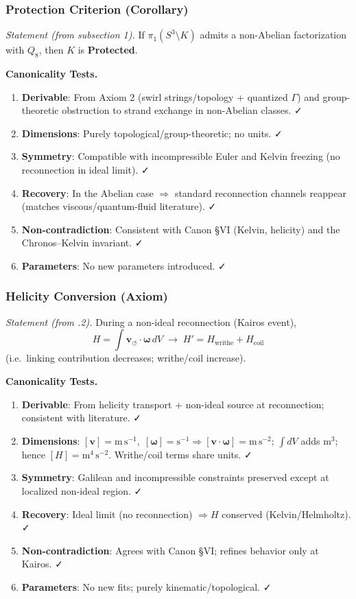 \documentclass[10pt,reprint,aps,onecolumn,nofootinbib]{revtex4-2}
\begin{document}
\subsubsection{Protection Criterion (Corollary)}
\emph{Statement (from subsection 1).} If $\pi_1(S^3\!\setminus\!K)$ admits a non-Abelian factorization with $Q_8$, then $K$ is \textbf{Protected}.

\textbf{Canonicality Tests.}
\begin{enumerate}
    \item \textbf{Derivable}: From Axiom 2 (swirl strings/topology + quantized $\Gamma$) and group-theoretic obstruction to strand exchange in non-Abelian classes. ✓
    \item \textbf{Dimensions}: Purely topological/group-theoretic; no units. ✓
    \item \textbf{Symmetry}: Compatible with incompressible Euler and Kelvin freezing (no reconnection in ideal limit). ✓
    \item \textbf{Recovery}: In the Abelian case $\Rightarrow$ standard reconnection channels reappear (matches viscous/quantum-fluid literature). ✓
    \item \textbf{Non-contradiction}: Consistent with Canon §VI (Kelvin, helicity) and the Chronos–Kelvin invariant. ✓
    \item \textbf{Parameters}: No new parameters introduced. ✓
\end{enumerate}

\subsubsection{Helicity Conversion (Axiom)}
\emph{Statement (from .2).} During a non-ideal reconnection (Kairos event),
\[
    H=\!\int \mathbf{v}_{\!\boldsymbol{\circlearrowleft}}\!\cdot\!\boldsymbol{\omega}\, dV
    \;\to\; H' = H_{\text{writhe}} + H_{\text{coil}}
\]
(i.e.\ linking contribution decreases; writhe/coil increase).

\textbf{Canonicality Tests.}
\begin{enumerate}
    \item \textbf{Derivable}: From helicity transport + non-ideal source at reconnection; consistent with literature. ✓
    \item \textbf{Dimensions}: $[\mathbf{v}]=\mathrm{m\,s^{-1}},\; [\boldsymbol{\omega}]=\mathrm{s^{-1}}\Rightarrow [\mathbf{v}\!\cdot\!\boldsymbol{\omega}]=\mathrm{m\,s^{-2}}$; $\int dV$ adds $\mathrm{m^3}$; hence $[H]=\mathrm{m^4\,s^{-2}}$. Writhe/coil terms share units. ✓
    \item \textbf{Symmetry}: Galilean and incompressible constraints preserved except at localized non-ideal region. ✓
    \item \textbf{Recovery}: Ideal limit (no reconnection) $\Rightarrow H$ conserved (Kelvin/Helmholtz). ✓
    \item \textbf{Non-contradiction}: Agrees with Canon §VI; refines behavior only at Kairos. ✓
    \item \textbf{Parameters}: No new fits; purely kinematic/topological. ✓
\end{enumerate}
\end{document}
